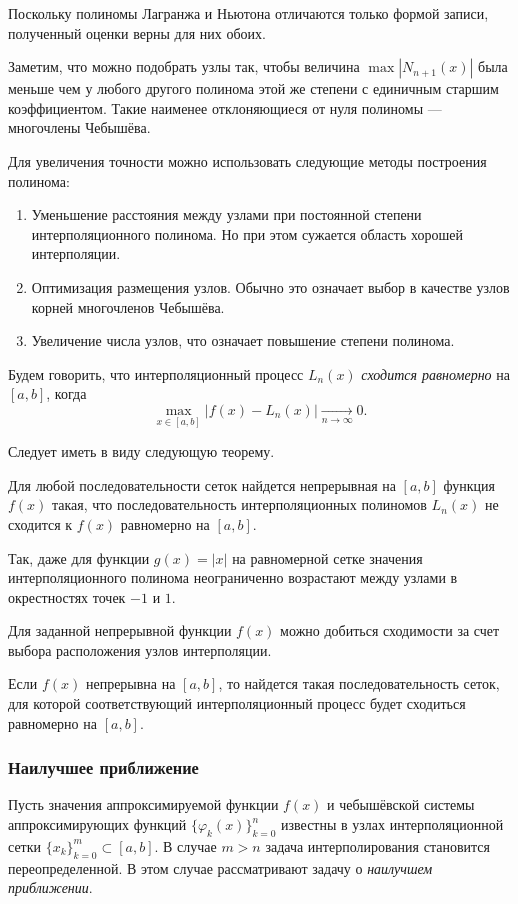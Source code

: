 Поскольку полиномы Лагранжа и Ньютона отличаются только формой записи,
полученный оценки верны для них обоих.

Заметим, что можно подобрать узлы так, чтобы величина $\max|N_{n+1}(x)|$
была меньше чем у любого другого полинома этой же степени с единичным
старшим коэффициентом. Такие наименее отклоняющиеся от нуля полиномы
--- многочлены Чебышёва.

Для увеличения точности можно использовать следующие методы построения
полинома:
\begin{enumerate}
\item Уменьшение расстояния между узлами при постоянной степени интерполяционного
полинома. Но при этом сужается область хорошей интерполяции.
\item Оптимизация размещения узлов. Обычно это означает выбор в качестве
узлов корней многочленов Чебышёва.
\item Увеличение числа узлов, что означает повышение степени полинома.
\end{enumerate}
Будем говорить, что интерполяционный процесс $L_{n}(x)$ \emph{сходится
равномерно} на $[a,b]$, когда
\[
\max_{x\in[a,b]}|f(x)-L_{n}(x)|\underset{n\rightarrow\infty}{\longrightarrow}0.
\]


Следует иметь в виду следующую теорему.
\begin{thm}
\emph{}Для любой последовательности сеток найдется непрерывная на
$[a,b]$ функция $f(x)$ такая, что последовательность интерполяционных
полиномов $L_{n}(x)$ не сходится к $f(x)$ равномерно на $[a,b]$.
\end{thm}
Так, даже для функции $g(x)=|x|$ на равномерной сетке значения интерполяционного
полинома неограниченно возрастают между узлами в окрестностях точек
$-1$ и $1$.

Для заданной непрерывной функции $f(x)$ можно добиться сходимости
за счет выбора расположения узлов интерполяции.
\begin{thm}
\emph{}Если $f(x)$ непрерывна на $[a,b]$, то найдется такая последовательность
сеток, для которой соответствующий интерполяционный процесс будет
сходиться равномерно на $[a,b]$.
\end{thm}

\subsubsection{Наилучшее приближение}

Пусть значения аппроксимируемой функции $f(x)$ и чебышёвской системы
аппроксимирующих функций $\{\varphi_{k}(x)\}_{k=0}^{n}$ известны
в узлах интерполяционной сетки $\{x_{k}\}_{k=0}^{m}\subset[a,b]$.
В случае $m>n$ задача интерполирования становится переопределенной.
В этом случае рассматривают задачу о \emph{наилучшем приближении}.

